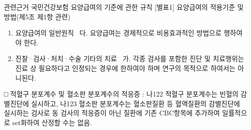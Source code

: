 \begin{commentbox}{관련근거}
국민건강보험 요양급여의 기준에 관한 규칙 [별표1] 요양급여의 적용기준 및 방법(제5조 제1항 관련)
\begin{enumerate}[1.]\tightlist
\item 요양급여의 일반원칙  다. 요양급여는 경제적으로 비용효과적인 방법으로 행하여야 한다.
\item 진찰·검사·처치·수술 기타의 치료  가. 각종 검사를 포함한 진단 및 치료행위는 진료 상 필요하다고 인정되는 경우에 한하여야 하며 연구의 목적으로 하여서는 아니된다.
\end{enumerate}
□ 적혈구 분포계수 및 혈소판 분포계수의 적응증 : 나122 적혈구 분포계수는 빈혈의 감별진단에 실시하고, 나123 혈소판 분포계수는 혈소판질환 등 혈액질환의 감별진단에 실시하는 검사로 동 검사의 적응증이 아닌 질환에 기존 CBC항목에 추가하여 일률적으로 set화하여 산정할 수는 없음.
\end{commentbox}
\clearpage
